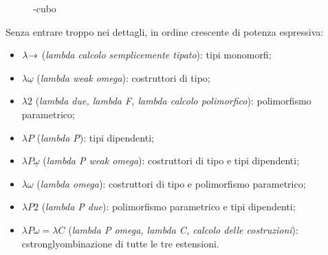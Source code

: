 \begin{figure}
    \vspace{4mm}
    \caption{\textlambda-cubo}
    \label{fig:3-lambda-cube}
    \vspace{4mm}
\end{figure}

\noindent Senza entrare troppo nei dettagli, in ordine crescente di potenza espressiva:

\begin{itemize}
    \item $\lambda\mkern-4mu\rightarrow$ (\textit{lambda calcolo semplicemente tipato}): tipi monomorfi;
    \item $\lambda\underline{\omega}$ (\textit{lambda weak omega}): costruttori di tipo;
    \item $\lambda2$ (\textit{lambda due, lambda F, lambda calcolo polimorfico}): polimorfismo parametrico;
    \item $\lambda P$ (\textit{lambda P}): tipi dipendenti;
    \item $\lambda P\underline{\omega}$ (\textit{lambda P weak omega}): costruttori di tipo e tipi dipendenti;
    \item $\lambda\omega$ (\textit{lambda omega}): costruttori di tipo e polimorfismo parametrico;
    \item $\lambda P2$ (\textit{lambda P due}): polimorfismo parametrico e tipi dipendenti;
    \item $\lambda P\omega\!=\!\lambda C$ (\textit{lambda P omega, lambda C, calcolo delle costruzioni}): cstronglyombinazione di tutte le tre estensioni.
\end{itemize}